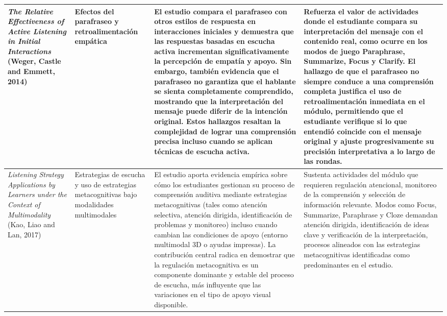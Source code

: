 \begin{center}
\begin{longtable}{| m{4.2cm} | m{3cm} | m{4.5cm} | m{4.5cm} |}
\textit{The Relative Effectiveness of Active Listening in Initial Interactions} (Weger, Castle and Emmett, 2014) \cite{weger_castle_emmett_2014_relative_effectiveness} &
Efectos del parafraseo y retroalimentación empática &
El estudio compara el parafraseo con otros estilos de respuesta en interacciones iniciales y demuestra que las respuestas basadas en escucha activa incrementan significativamente la percepción de empatía y apoyo. Sin embargo, también evidencia que el parafraseo no garantiza que el hablante se sienta completamente comprendido, mostrando que la interpretación del mensaje puede diferir de la intención original. Estos hallazgos resaltan la complejidad de lograr una comprensión precisa incluso cuando se aplican técnicas de escucha activa. &
Refuerza el valor de actividades donde el estudiante compara su interpretación del mensaje con el contenido real, como ocurre en los modos de juego Paraphrase, Summarize, Focus y Clarify. El hallazgo de que el parafraseo no siempre conduce a una comprensión completa justifica el uso de retroalimentación inmediata en el módulo, permitiendo que el estudiante verifique si lo que entendió coincide con el mensaje original y ajuste progresivamente su precisión interpretativa a lo largo de las rondas. \\ \hline

\textit{Listening Strategy Applications by Learners under the Context of Multimodality} (Kao, Liao and Lan, 2017) \cite{kao_liao_lan_2017_listening_strategies} &
Estrategias de escucha y uso de estrategias metacognitivas bajo modalidades multimodales &
El estudio aporta evidencia empírica sobre cómo los estudiantes gestionan su proceso de comprensión auditiva mediante estrategias metacognitivas (tales como atención selectiva, atención dirigida, identificación de problemas y monitoreo) incluso cuando cambian las condiciones de apoyo (entorno multimodal 3D o ayudas impresas). La contribución central radica en demostrar que la regulación metacognitiva es un componente dominante y estable del proceso de escucha, más influyente que las variaciones en el tipo de apoyo visual disponible. &
Sustenta actividades del módulo que requieren regulación atencional, monitoreo de la comprensión y selección de información relevante. Modos como Focus, Summarize, Paraphrase y Cloze demandan atención dirigida, identificación de ideas clave y verificación de la interpretación, procesos alineados con las estrategias metacognitivas identificadas como predominantes en el estudio. \\ \hline


\end{longtable}
\end{center}
